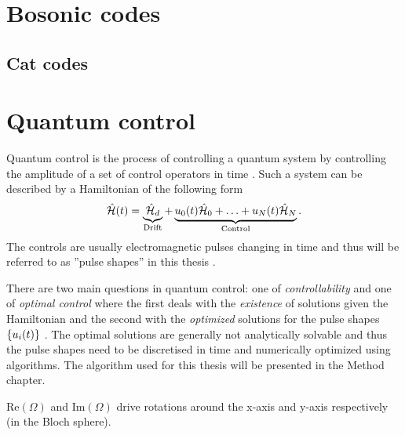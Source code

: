 \documentclass[main.tex]{subfiles}
\begin{document}
\section{Bosonic codes}


\subsection{Cat codes}



\section{Quantum control}
Quantum control is the process of controlling a quantum system by controlling the amplitude of a set of control operators in time \cite{fisher_optimal_2010}. Such a system can be described \cite{fisher_optimal_2010} by a Hamiltonian of the following form
\begin{equation}
    \hat{\mathcal{H}}(t) = \underbrace{\hat{\mathcal{H}}_d}_{\text{Drift}} + \underbrace{u_0(t)\hat{\mathcal{H}}_0 + \dotsc + u_N(t)\hat{\mathcal{H}}_N}_{\text{Control}}.
\end{equation}
The controls are usually electromagnetic pulses changing in time and thus will be referred to as ''pulse shapes'' in this thesis \cite{fisher_optimal_2010}.

There are two main questions in quantum control: one of \emph{controllability} and one of \emph{optimal control} where the first deals with the \emph{existence} of solutions given the Hamiltonian and the second with the \emph{optimized} solutions for the pulse shapes \(\qty{u_i(t)}\) \autocite{dalessandro_introduction_2007}. The optimal solutions are generally not analytically solvable and thus the pulse shapes need to be discretised in time  and numerically optimized using algorithms. The algorithm used for this thesis will be presented in the Method chapter.


\(\text{Re}(\Omega)\) and \(\text{Im}(\Omega)\) drive rotations around the x-axis and y-axis respectively (in the Bloch sphere). 
\end{document}
